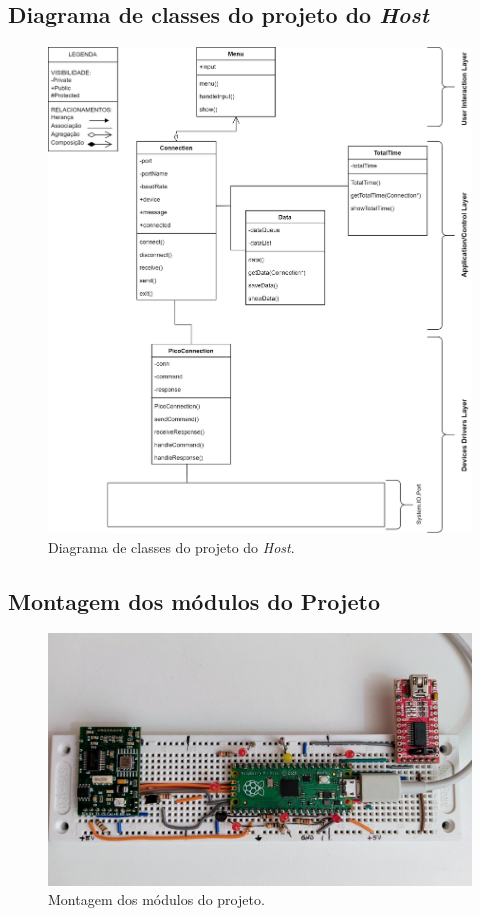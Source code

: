 \documentclass[10pt,twocolumn,letterpaper]{article}
\begin{document}
\subsection*{Diagrama de classes do projeto do \emph{Host}}
\begin{figure}[h]
  \centering
  \includegraphics[keepaspectratio=true,scale=0.55]{figures/Diagrama_Classe_Host_PC.png}
  \caption{Diagrama de classes do projeto do \emph{Host}.}
  \label{fig:diagrama-host}
\end{figure}

\onecolumn
{}
\label{apendice-c}

\subsection*{Montagem dos módulos do Projeto}
\begin{figure}[h]
  \centering
  \includegraphics[keepaspectratio=true,scale=0.12]{figures/montagem.jpg}
  \caption{Montagem dos módulos do projeto.}
  \label{fig:montagem}
\end{figure}
\end{document}
